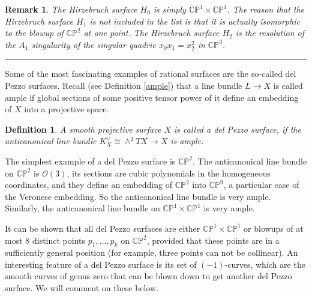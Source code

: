 \documentclass[11pt]{article}
\numberwithin{equation}{section}
\numberwithin{footnote}{section}
\newtheorem{defn}[thm]{Definition}
\newtheorem{rem}[thm]{Remark}
\newcommand{\blue}{\color{blue}}
\renewcommand{\P}{{\mathbb P}}
\newcommand{\C}{{\mathbb C}}
\newcommand{\CP}{{\mathbb C \mathbb P}}
\begin{document}
\smallskip
\begin{rem}
The Hirzebruch surface $H_0$ is simply $\CP^1 \times \C\P^1$. The reason that the Hirzebruch surface $H_{1}$ is not included in the list is that it is actually isomorphic to 
the blowup of $\C\P^2$ at one point. The Hirzebruch surface $H_2$ is the resolution of the $A_1$ singularity of the singular quadric
$x_0x_1 = x_2^2$ in $\C\P^3$.
\end{rem}

\smallskip
{\blue \hrule}
Some of the most fascinating examples of rational surfaces are the so-called {\blue del Pezzo} surfaces. Recall (see Definition \ref{ample}) that  a line bundle $L\to X$ is called ample if global sections of some positive tensor power of it define an embedding of $X$ into a projective space.

\smallskip
\begin{defn}\label{defdp}
A smooth projective surface $X$ is called a del Pezzo surface, if the anticanonical line bundle $K_X^\vee \cong \wedge^2 TX \to X$ is ample.
\end{defn}

The simplest example of a del Pezzo surface is $\C\P^2$. The anticanonical line bundle on $\C\P^2$ is $\mathcal O(3)$, its sections are cubic polynomials in the homogeneous coordinates, and they define an embedding of $\C\P^2$ into $\C\P^9$, a particular case of the Veronese embedding. So the anticanonical line bundle is very ample. Similarly, the anticanonical line bundle on $\C\P^1\times \C\P^1$ is very ample.

\smallskip
It can be shown that all del Pezzo surfaces are either $\C\P^1 \times \C\P^1$ or blowups of at most $8$ distinct points $p_1,\ldots,p_k$
on $\C\P^2$, provided that these points are in a sufficiently general position (for example, three points can not be collinear).
An interesting feature of a del Pezzo surface is its set of $(-1)$-curves, which are the smooth curves of genus zero that can be blown down to get another del Pezzo surface. We will comment on these below.
\end{document}
